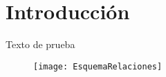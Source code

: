 \chapter{Introducción}

Texto de prueba

\begin{figure}[h!]
	\texttt{[image: EsquemaRelaciones]}
	\centering
\end{figure}